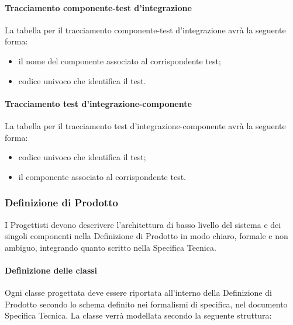 \paragraph{Tracciamento componente-test d'integrazione}
La tabella per il tracciamento componente-test d'integrazione avrà la seguente forma:
\begin{itemize}
\item {} il nome del componente associato al corrispondente test;
\item {}codice univoco che identifica il test.
\end{itemize}

\paragraph{Tracciamento test d'integrazione-componente}
La tabella per il tracciamento test d'integrazione-componente avrà la seguente forma:
\begin{itemize}
\item {}codice univoco che identifica il test;
\item {} il componente associato al corrispondente test.
\end{itemize}

\subsubsection{Definizione di Prodotto}
\label{}
I Progettisti devono descrivere l'architettura di basso livello del sistema e dei singoli componenti nella Definizione di Prodotto in modo chiaro, formale e non ambiguo, integrando quanto scritto nella Specifica Tecnica.



\paragraph{Definizione delle classi}
\label{}


Ogni classe progettata deve essere riportata all'interno della Definizione di Prodotto secondo lo schema definito nei formalismi di specifica, nel documento Specifica Tecnica. La classe verrà modellata secondo la seguente struttura:


